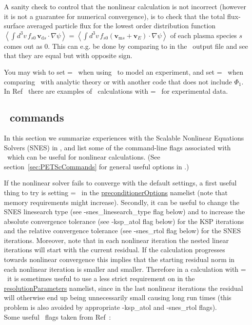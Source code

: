 A sanity check to control that the nonlinear calculation is not incorrect (however it is not a guarantee for numerical convergence), is to check that the total flux-surface averaged particle flux for the lowest order distribution function $\displaystyle \left\langle \int d^3 v \, f_{s0} \, \bm{v}_{\mathrm{d} s} \cdot \nabla \psi \right\rangle = \left\langle \int d^3 v \, f_{s0} \left(\bm{v}_{\mathrm{m} s} + \bm{v}_{E}\right) \cdot \nabla \psi \right\rangle$ of each plasma species $s$ comes out as 0. This can e.g. be done by comparing  to  in the \sfincs~output file  and see that they are equal but with opposite sign. 

You may wish to set  = \true~when
using \sfincs~to model an experiment, and set  = \false~when
comparing \sfincs~with analytic theory or with another code that does not include $\Phi_1$. 
In Ref~\cite{Mollen2018} there are examples of \sfincs~calculations with  = \true~for experimental data.

\subsection{\PETSc~commands}
In this section we summarize experiences with the Scalable Nonlinear Equations Solvers (SNES) in \PETSc, 
and list some of the command-line flags associated with \PETSc~which can be useful for nonlinear calculations. 
(See section~\ref{sec:PETScCommands} for general useful options in \sfincs.) 

If the nonlinear solver fails to converge with the default settings, a first useful thing to try is setting  = \false~in the {\ttfamily \hyperref[sec:preconditionerOptions]{preconditionerOptions}} namelist (note that memory requirements might increase). 
Secondly, it can be useful to change the SNES linesearch type (see -snes\_linesearch\_type flag below) and to increase the absolute convergence tolerance (see -ksp\_atol flag below) for the KSP iterations and the relative convergence tolerance (see -snes\_rtol flag below) for the SNES iterations. 
Moreover, note that in each nonlinear iteration the nested linear iterations will start with the current residual. If the calculation progresses towards nonlinear convergence this implies that the starting residual norm in each nonlinear iteration is smaller and smaller. Therefore in a calculation with  = \true~it is sometimes useful to use a less strict requirement on  in the {\ttfamily \hyperref[sec:resolutionParameters]{resolutionParameters}} namelist, since in the last nonlinear iterations the residual will otherwise end up being unnecessarily small causing long run times (this problem is also avoided by appropriate -ksp\_atol and -snes\_rtol flags).\\ 
Some useful \PETSc~flags taken from Ref~\cite{PETSc2017}:\\


